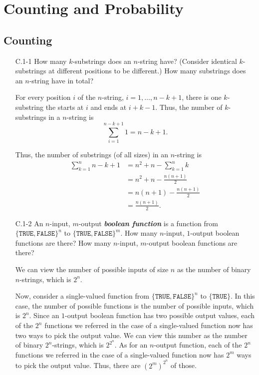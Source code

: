 \chapter{Counting and Probability}

\section{Counting}

\begin{enumerate}

\item[C.1{-}1] {How many $k$-substrings does an $n$-string have? (Consider
identical $k$-substrings at different positions to be different.) How many
substrings does an $n$-string have in total?}

\begin{framed}
For every position $i$ of the $n$-string, $i = 1, \dots, n - k + 1$, there is
one $k$-substring the starts at $i$ and ends at $i + k - 1$. Thus, the number of
$k$-substrings in a $n$-string is
\[
  \sum_{i = 1}^{n - k + 1} 1 = n - k + 1.
\]

Thus, the number of substrings (of all sizes) in an $n$-string is
\begin{equation*}
\begin{aligned}
  \sum_{k = 1}^{n} n - k + 1 &= n^2 + n - \sum_{k = 1}^{n} {k}\\
                             &= n^2 + n - \frac{n (n + 1)}{2}\\
                             &= n (n + 1) - \frac{n (n + 1)}{2}\\
                             &= \frac{n (n + 1)}{2}.
\end{aligned}
\end{equation*}
\end{framed}

\item[C.1{-}2] {An $n$-input, $m$-output \textbf{\emph{boolean function}} is
a function from $\{\texttt{TRUE}, \texttt{FALSE}\}^n$ to
$\{\texttt{TRUE}, \texttt{FALSE}\}^m$. How many $n$-input, $1$-output boolean
functions are there? How many $n$-input, $m$-output boolean functions are
there?}

\begin{framed}
We can view the number of possible inputs of size $n$ as the number of binary
$n$-strings, which is $2^n$.

Now, consider a single-valued function from $\{\texttt{TRUE},
\texttt{FALSE}\}^n$ to $\{\texttt{TRUE}\}$. In this case, the number of
possible functions is the number of possible inputs, which is $2^n$. Since an
$1$-output boolean function has two possible output values, each of the $2^n$
functions we referred in the case of a single-valued function now has two ways
to pick the output value. We can view this number as the number of binary
$2^n$-strings, which is $2^{2^n}$. As for an $n$-output function, each of the
$2^n$ functions we referred in the case of a single-valued function now has
$2^m$ ways to pick the output value. Thus, there are $({2^m})^{2^n}$ of those.
\end{framed}


\end{enumerate}
